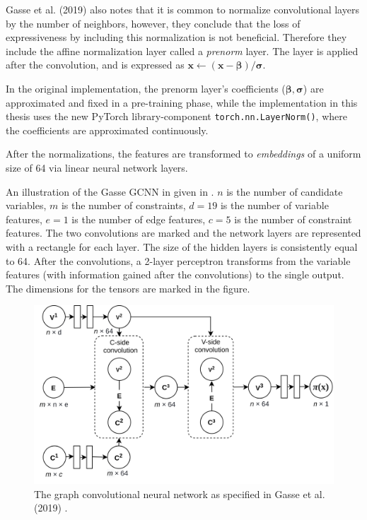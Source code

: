 Gasse et al. (2019) \cite{gasse2019exact} also notes that it is common to normalize convolutional layers by the number of neighbors, however, they conclude that the loss of expressiveness by including this normalization is not beneficial. Therefore they include the affine normalization layer called a \textit{prenorm} layer. The layer is applied after the convolution, and is expressed as $ \mathbf{x} \leftarrow (\mathbf{x}-\bm{\beta})/\bm{\sigma}$. 

In the original implementation, the prenorm layer's coefficients ($\bm{\beta}, \bm{\sigma}$) are approximated and fixed in a pre-training phase, while the implementation in this thesis uses the new PyTorch library-component \verb|torch.nn.LayerNorm()|, where the coefficients are approximated continuously.     

After the normalizations, the features are transformed to \textit{embeddings} of a uniform size of 64 via linear neural network layers. 

An illustration of the Gasse \gls{GCNN} in given in . $n$ is the number of candidate variables, $m$ is the number of constraints, $d=19$ is the number of variable features, $e=1$ is the number of edge features, $c=5$ is the number of constraint features. The two convolutions are marked and the network layers are represented with a rectangle for each layer. The size of the hidden layers is consistently equal to 64. After the convolutions, a 2-layer perceptron transforms from the variable features (with information gained after the convolutions) to the single output. The dimensions for the tensors are marked in the figure. 
\begin{figure}
    \centering
    \includegraphics[width=\linewidth]{img/gnn2.png}
    \caption{The graph convolutional neural network as specified in Gasse et al. (2019) \cite{gasse2019exact}.}
    \label{fig:gnn2}
\end{figure}






